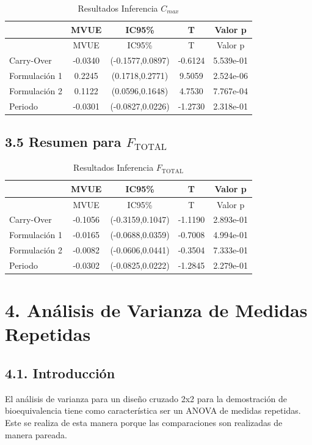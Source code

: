 \documentclass[]{article}
\begin{document}
\begin{longtable}[]{@{}lcccc@{}}
\caption{Resultados Inferencia \(C_{max}\)}\tabularnewline
\toprule
& MVUE & IC95\% & T & Valor p\tabularnewline
\midrule
\endfirsthead
\toprule
& MVUE & IC95\% & T & Valor p\tabularnewline
\midrule
\endhead
Carry-Over & -0.0340 & (-0.1577,0.0897) & -0.6124 &
5.539e-01\tabularnewline
Formulación 1 & 0.2245 & (0.1718,0.2771) & 9.5059 &
2.524e-06\tabularnewline
Formulación 2 & 0.1122 & (0.0596,0.1648) & 4.7530 &
7.767e-04\tabularnewline
Periodo & -0.0301 & (-0.0827,0.0226) & -1.2730 &
2.318e-01\tabularnewline
\bottomrule
\end{longtable}

\subsection{\texorpdfstring{3.5 Resumen para
\(F_{\textrm{TOTAL}}\)}{3.5 Resumen para F\_\{\textbackslash{}textrm\{TOTAL\}\}}}\label{resumen-para-f_textrmtotal}

\begin{longtable}[]{@{}lcccc@{}}
\caption{Resultados Inferencia \(F_{\textrm{TOTAL}}\)}\tabularnewline
\toprule
& MVUE & IC95\% & T & Valor p\tabularnewline
\midrule
\endfirsthead
\toprule
& MVUE & IC95\% & T & Valor p\tabularnewline
\midrule
\endhead
Carry-Over & -0.1056 & (-0.3159,0.1047) & -1.1190 &
2.893e-01\tabularnewline
Formulación 1 & -0.0165 & (-0.0688,0.0359) & -0.7008 &
4.994e-01\tabularnewline
Formulación 2 & -0.0082 & (-0.0606,0.0441) & -0.3504 &
7.333e-01\tabularnewline
Periodo & -0.0302 & (-0.0825,0.0222) & -1.2845 &
2.279e-01\tabularnewline
\bottomrule
\end{longtable}

\section{4. Análisis de Varianza de Medidas
Repetidas}\label{analisis-de-varianza-de-medidas-repetidas}

\subsection{4.1. Introducción}\label{introduccion}

El análisis de varianza para un diseño cruzado 2x2 para la demostración
de bioequivalencia tiene como característica ser un ANOVA de medidas
repetidas. Este se realiza de esta manera porque las comparaciones son
realizadas de manera pareada.
\end{document}

